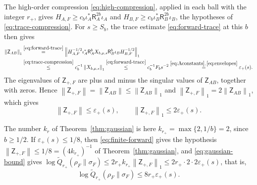 \documentclass[11pt]{amsart}
\numberwithin{equation}{section}
\theoremstyle{definition}
\newcommand{\Res}{\mathsf R}
\newcommand{\Qtil}{\widetilde Q}
\newcommand{\norm}[1]{\left\|#1\right\|}
\begin{document}
The high-order compression \eqref{eq:high-compression}, applied in each
ball with the integer \(r_+\), gives
\(H_{A,F}\ge c_b\iota_A^*\Res_A^{2b}\iota_A\) and
\(H_{B,F}\ge c_b\iota_B^*\Res_B^{2b}\iota_B\), the hypotheses of
\eqref{eq:trace-compression}. For \(s\ge S_b\), the trace estimate
\eqref{eq:forward-trace} at this \(b\) then gives
\begin{align*}
 \norm{\mathsf Z_{AB}}_1
 &\overset{\eqref{eq:forward-trace}}{=}
 \norm{H_{A,F}^{-1/2}\iota_A^*\Res_A^bX_{b,\mu,s}\Res_B^b
 \iota_BH_{B,F}^{-1/2}}_1\\
 &\overset{\eqref{eq:trace-compression}}{\le}
 c_b^{-1}\norm{X_{b,\mu,s}}_1
 \overset{\eqref{eq:forward-trace}}{\le}
 c_b^{-1}F_bs^{-2}
 \overset{\eqref{eq:Aconstants},\,\eqref{eq:envelopes}}{=}
 \varepsilon_+(s).
\end{align*}
The eigenvalues of \(\mathsf Z_{+,F}\) are plus and minus the singular
values of \(\mathsf Z_{AB}\), together with zeros. Hence
\(\norm{\mathsf Z_{+,F}}=\norm{\mathsf Z_{AB}}\le\norm{\mathsf Z_{AB}}_1\)
and \(\norm{\mathsf Z_{+,F}}_1=2\norm{\mathsf Z_{AB}}_1\), which gives
\begin{equation}
 \norm{\mathsf Z_{+,F}}\le\varepsilon_+(s),\qquad
 \norm{\mathsf Z_{+,F}}_1\le2\varepsilon_+(s).
 \label{eq:finite-forward}
\end{equation}

The number \(k_r\) of Theorem~\ref{thm:gaussian} is here
\(k_{r_+}=\max\{2,1/b\}=2\), since \(b\ge1/2\). If
\(\varepsilon_+(s)\le1/8\), then \eqref{eq:finite-forward} gives the
hypothesis \(\norm{\mathsf Z_{+,F}}\le1/8=(4k_{r_+})^{-1}\) of
Theorem~\ref{thm:gaussian}, and \eqref{eq:gaussian-bound} gives
\(\log\Qtil_{r_+}(\rho_F\|\sigma_F)\le2r_+k_{r_+}\norm{\mathsf Z_{+,F}}_1
\le2r_+\cdot2\cdot2\varepsilon_+(s)\), that is,
\begin{equation}
 \log\Qtil_{r_+}(\rho_F\|\sigma_F)
 \le8r_+\varepsilon_+(s).
 \label{eq:Qforward}
\end{equation}
\end{document}
